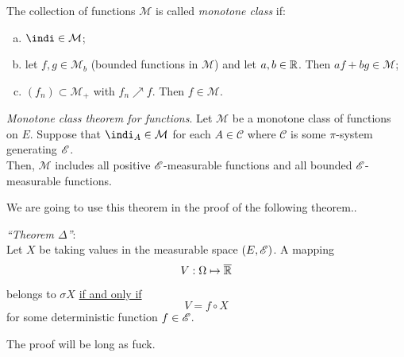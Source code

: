 \documentclass{report}
\begin{document}
\begin{revise}
	\begin{definition}
		The collection of functions $\mathcal{M}$ is called \emph{monotone class} if:
		\begin{enumerate}[a)]
			\item $\indi\in\mathcal{M}$;
			\item let $f,g\in\mathcal{M}_b$ (bounded functions in $\mathcal{M}$) and let $a,b\in\mathbb{R}$. Then $af+bg\in\mathcal{M}$;
			\item $(f_n)\subset\mathcal{M}_+$ with $f_n\nearrow f$. Then $f\in\mathcal{M}$.
		\end{enumerate}
	\end{definition}
	\begin{theorem}
		\emph{Monotone class theorem for functions}.
		Let $\mathcal{M}$ be a monotone class of functions on $E$. Suppose that $\indi_A\in\mathcal{M}$ for each $A\in\mathcal{C}$ where $\mathcal{C}$ is some $\pi$-system generating $\mathscr{E}$.\\
		Then, $\mathcal{M}$ includes all positive $\mathscr{E}$-measurable functions and all bounded $\mathscr{E}$-measurable functions.
	\end{theorem}
\end{revise}
	We are going to use this theorem in the proof of the following theorem..
	\begin{theorem}\label{teodelta}
		\emph{``Theorem $\Delta$''}:\\
		Let $X$ be \rv{} taking values in the measurable space $(E,\mathscr{E})$. A mapping
		\[V:\Omega\mapsto\overline{\mathbb{R}}\]
		belongs to $\sigma X$ \underline{if and only if}
		\[V=f\circ X\]
		for some deterministic function $f\in\mathscr{E}$.
	\end{theorem}
The proof will be long as fuck.
\end{document}
